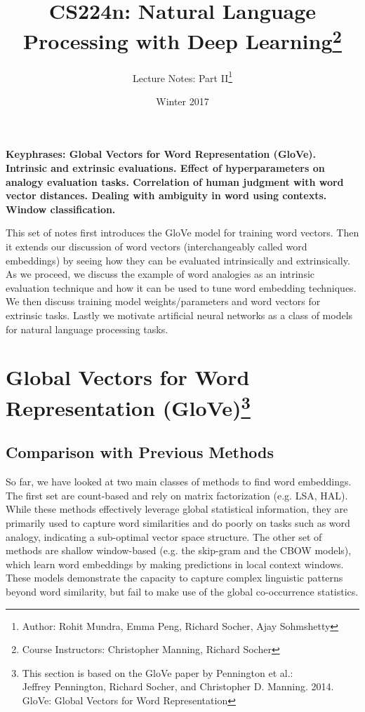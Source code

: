 \documentclass{tufte-handout}
\title{CS224n: Natural Language Processing with Deep Learning\thanks{Course Instructors: Christopher Manning, Richard Socher}}
\author[Rohit Mundra, Richard Socher]{Lecture Notes: Part II\thanks{Author: Rohit Mundra, Emma Peng, Richard Socher, Ajay Sohmshetty}}
\date{Winter 2017} %
\begin{document}
\maketitle%



\textbf{Keyphrases: Global Vectors for Word Representation (GloVe). Intrinsic and extrinsic evaluations. Effect of hyperparameters on analogy evaluation tasks. Correlation of human judgment with word vector distances. Dealing with ambiguity in word using contexts. Window classification.}

This set of notes first introduces the GloVe model for training word vectors. Then it extends our discussion of word vectors (interchangeably called word embeddings) by seeing how they can be evaluated intrinsically and extrinsically. As we proceed, we discuss the example of word analogies as an intrinsic evaluation technique and how it can be used to tune word embedding techniques. We then discuss training model weights/parameters and word vectors for extrinsic tasks. Lastly we motivate artificial neural networks as a class of models for natural language processing tasks.

\section[GloVe]{Global Vectors for Word Representation (GloVe)\footnote{This section is based on the GloVe paper by Pennington et al.: \\ Jeffrey Pennington, Richard Socher, and Christopher D. Manning. 2014. GloVe: Global Vectors for Word Representation}}

\subsection{Comparison with Previous Methods}
So far, we have looked at two main classes of methods to find word embeddings. The first set are count-based and rely on matrix factorization (e.g. LSA, HAL). While these methods effectively leverage global statistical information, they are primarily used to capture word similarities and do poorly on tasks such as word analogy, indicating a sub-optimal vector space structure. 
The other set of methods are shallow window-based (e.g. the skip-gram and the CBOW models), which learn word embeddings by making predictions in local context windows. These models demonstrate the capacity to capture complex linguistic patterns beyond word similarity, but fail to make use of the global co-occurrence statistics.
\end{document}
